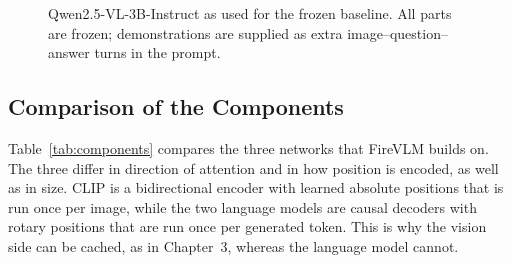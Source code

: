 \documentclass[12pt]{report}
\begin{document}
\begin{figure}[htbp]
  \centering
  \caption{Qwen2.5-VL-3B-Instruct as used for the frozen baseline. All parts are frozen; demonstrations are supplied as extra image--question--answer turns in the prompt.}
  \label{fig:qwenvl}
\end{figure}

\subsection{Comparison of the Components}
Table~\ref{tab:components} compares the three networks that FireVLM builds on. The three differ in direction of attention and in how position is encoded, as well as in size. CLIP is a bidirectional encoder with learned absolute positions that is run once per image, while the two language models are causal decoders with rotary positions that are run once per generated token. This is why the vision side can be cached, as in Chapter~3, whereas the language model cannot.
\end{document}
